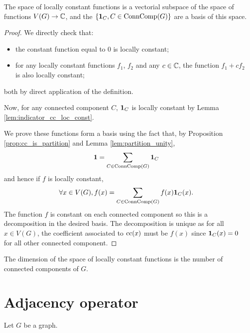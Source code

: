 \begin{lemma}
  \label{thm:locally_constant_basis}
  The space of locally constant functions is a vectorial subspace of
  the space of functions $V(G) \rightarrow \mathbb{C}$, and the $\{\mathbf{1}_C, C \in \mathrm{ConnComp}(G)\}$
  are a basis of this space.
\end{lemma}

\begin{proof}
  We directly check that:
  \begin{itemize}
    \item the constant function equal to $0$ is locally constant;
    \item for any locally constant functions $f_1$, $f_2$ and any $c \in \mathbb{C}$,
    the function $f_1+cf_2$ is also locally constant;
  \end{itemize}
  both by direct application of the definition.

  Now, for any connected component $C$, $\mathbf{1}_C$ is locally
  constant by Lemma \ref{lem:indicator_cc_loc_const}.

  We prove these functions form a basis using the fact that, by
  Proposition \ref{prop:cc_is_partition} and Lemma \ref{lem:partition_unity},
  \begin{equation*}
    \mathbf{1} = \sum_{C \in \mathrm{ConnComp}(G)} \mathbf{1}_C
  \end{equation*}
  and hence if $f$ is locally constant,
    \begin{equation*}
      \forall x \in V(G),
    f(x) = \sum_{C \in \mathrm{ConnComp}(G)} f(x) \mathbf{1}_C(x).
  \end{equation*}
  The function $f$ is constant on each connected component so this is a decomposition
  in the desired basis. The decomposition is unique as for all $x \in V(G)$, the coefficient
  associated to $\mathrm{cc}(x)$ must be $f(x)$ since $\mathbf{1}_C(x)=0$ for all other connected component.
\end{proof}

\begin{corollary}
  \label{cor:dimension_locally_constant}
  The dimension of the space of locally constant functions is the number of
  connected components of $G$.
\end{corollary}

\section{Adjacency operator}

Let $G$ be a graph.

